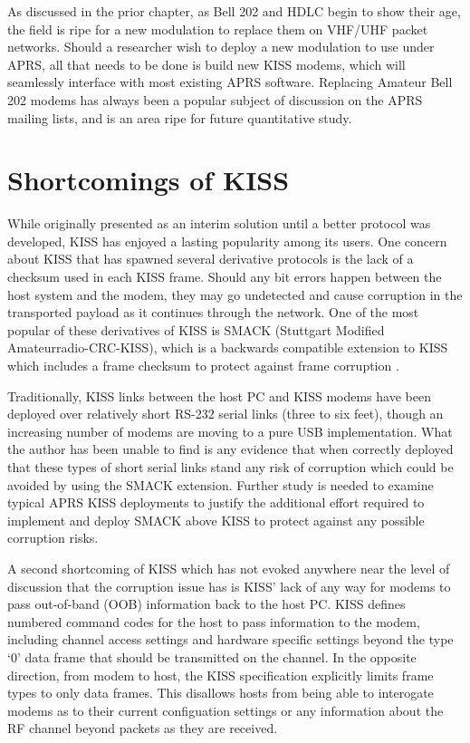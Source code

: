 As discussed in the prior chapter,
as Bell 202 and HDLC begin to show their age, the field is ripe for a new
modulation to replace them on VHF/UHF packet networks.
Should a researcher wish to deploy a new modulation to use under APRS,
all that needs to be done is build new KISS modems, which will seamlessly
interface with most existing APRS software.
Replacing Amateur Bell 202 modems has always been a popular subject of
discussion on the APRS mailing lists, and is an area ripe for future
quantitative study.

\section{Shortcomings of KISS}

While originally presented as an interim solution until a better protocol was
developed, KISS has enjoyed a lasting popularity among its users.
One concern about KISS that has spawned several derivative protocols is the
lack of a checksum used in each KISS frame.
Should any bit errors happen between the host system and the modem,
they may go undetected and cause corruption in the transported payload
as it continues through the network.
One of the most popular of these derivatives of KISS is SMACK (Stuttgart Modified
Amateurradio-CRC-KISS), which is a backwards compatible extension to KISS
which includes a frame checksum to protect against frame corruption \cite{smack}.

Traditionally, KISS links between the host PC and KISS modems have been deployed
over relatively short RS-232 serial links (three to six feet),
though an increasing number of modems are moving to a pure USB implementation.
What the author has been unable to find is any evidence that when correctly
deployed that these types of short serial links stand any risk of corruption
which could be avoided by using the SMACK extension.
Further study is needed to examine typical APRS KISS deployments to justify
the additional effort required to implement and deploy SMACK above KISS to
protect against any possible corruption risks.

A second shortcoming of KISS which has not evoked anywhere near the
level of discussion that the corruption issue has is KISS' lack of any way
for modems to pass out-of-band (OOB) information back to the host PC.
KISS defines numbered command codes for the host to pass information to the
modem, including channel access settings and hardware specific settings
beyond the type `0' data frame that should be transmitted on the channel.
In the opposite direction, from modem to host, the KISS specification explicitly
limits frame types to only data frames.
This disallows hosts from being able to interogate modems as to their
current configuation settings or any information about the RF channel
beyond packets as they are received.

